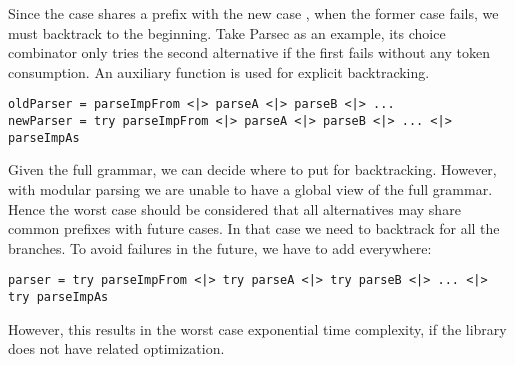 Since the  case shares a prefix with the new case , when the former case fails, we must backtrack to the beginning. Take Parsec as an example, its choice
combinator \inlinecode{<|>} only tries the second alternative if the first fails
without any token consumption. An auxiliary function  is used for explicit backtracking.

\begin{lstlisting}[language=PlainCode]
oldParser = parseImpFrom <|> parseA <|> parseB <|> ...
newParser = try parseImpFrom <|> parseA <|> parseB <|> ... <|> parseImpAs
\end{lstlisting}

Given the full grammar, we can decide where to put  for backtracking. However, with modular parsing we are unable to have a global view of the full grammar. Hence the worst case should be considered that all alternatives may share common prefixes with future cases. In that case we need to backtrack for all the branches. To avoid failures in the future, we have to add  everywhere:

\begin{lstlisting}[language=PlainCode]
parser = try parseImpFrom <|> try parseA <|> try parseB <|> ... <|> try parseImpAs
\end{lstlisting}

\noindent However, this results in the worst case exponential time complexity, if the library does not have related optimization.

